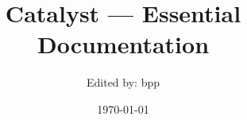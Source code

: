 
\pagestyle{empty}

\title{Catalyst --- Essential Documentation}
\author{Edited by: bpp}
\date{\today}

\maketitle



\cleardoublepage
{}
\pagestyle{headings}

\tableofcontents

\cleardoublepage
{}

